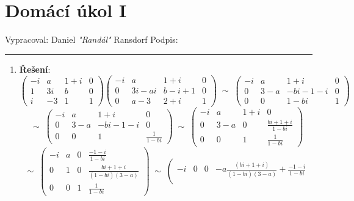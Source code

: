 \documentclass[12pt]{article}
\begin{document}
\section*{Domácí úkol I}

Vypracoval: Daniel \textit{"Randál"} Ransdorf \hfill Podpis: \rule{4cm}{0.4pt}

\begin{enumerate}
  \item \textbf{Řešení}:
    \[
      \left(\begin{array}{ccc|c}
      -i & a & 1+i & 0 \\
      1 & 3i & b & 0 \\
      i & -3 & 1 & 1
      \end{array}\right)
      \left(\begin{array}{ccc|c}
      -i & a & 1+i & 0 \\
      0 & 3i-ai & b-i+1 & 0 \\
      0 & a-3 & 2+i & 1
      \end{array}\right)
      \;\sim\;
      \left(\begin{array}{ccc|c}
      -i & a & 1+i & 0 \\
      0 & 3-a & -bi-1-i & 0 \\
      0 & 0 & 1-bi & 1
      \end{array}\right)
    \]
    \[
      \;\sim\;
      \left(\begin{array}{ccc|c}
      -i & a & 1+i & 0 \\
      0 & 3-a & -bi-1-i & 0 \\
      0 & 0 & 1 & \frac{1}{1-bi}
      \end{array}\right)
      \;\sim\;
      \left(\begin{array}{ccc|c}
      -i & a & 1+i & 0 \\
      0 & 3-a & 0 & \frac{bi+1+i}{1-bi} \\
      0 & 0 & 1 & \frac{1}{1-bi}
      \end{array}\right)
    \]
    \[
      \;\sim\;
      \left(\begin{array}{ccc|c}
      -i & a & 0 & \frac{-1-i}{1-bi} \\
      0 & 1 & 0 & \frac{bi+1+i}{(1-bi)(3-a)} \\
      0 & 0 & 1 & \frac{1}{1-bi}
      \end{array}\right)
      \;\sim\;
      \left(\begin{array}{ccc|c}
      -i & 0 & 0 & -a \frac{(bi+1+i)}{(1-bi)(3-a)}+\frac{-1-i}{1-bi} \\

\end{array}\]
\end{enumerate}
\end{document}

